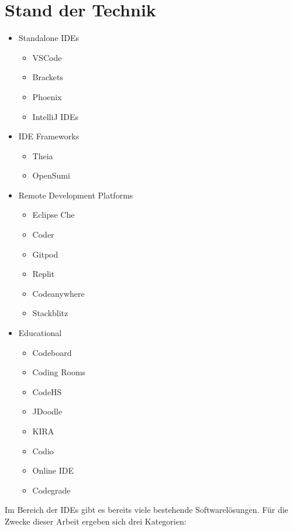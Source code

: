\chapter{Stand der Technik} \label{stand_der_technik}

\begin{itemize}
    \item Standalone IDEs
          \begin{itemize}
              \item VSCode
              \item Brackets
              \item Phoenix
              \item IntelliJ IDEs
          \end{itemize}
    \item IDE Frameworks
          \begin{itemize}
              \item Theia
              \item OpenSumi
          \end{itemize}
    \item Remote Development Platforms
          \begin{itemize}
              \item Eclipse Che
              \item Coder
              \item Gitpod
              \item Replit
              \item Codeanywhere
              \item Stackblitz
          \end{itemize}
    \item Educational
          \begin{itemize}
              \item Codeboard
              \item Coding Rooms
              \item CodeHS
              \item JDoodle
              \item KIRA
              \item Codio
              \item Online IDE
              \item Codegrade
          \end{itemize}
\end{itemize}

Im Bereich der IDEs gibt es bereits viele bestehende Softwarelösungen. Für die Zwecke dieser Arbeit ergeben sich drei Kategorien:

